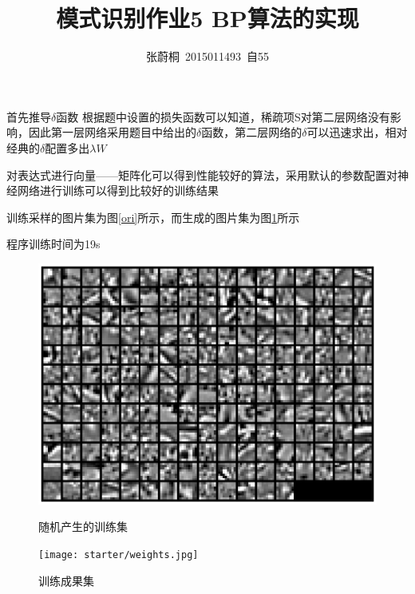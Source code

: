 \documentclass[UTF8,a4paper]{ctexart}
\title{模式识别作业5 BP算法的实现}
\author{张蔚桐\ 2015011493\ 自55}
\begin{document}
\maketitle
首先推导$\delta$函数
根据题中设置的损失函数可以知道，稀疏项S对第二层网络没有影响，因此第一层网络采用题目中给出的$\delta$函数，第二层网络的$\delta$可以迅速求出，相对经典的$\delta$配置多出$\lambda W$

对表达式进行向量——矩阵化可以得到性能较好的算法，采用默认的参数配置对神经网络进行训练可以得到比较好的训练结果

训练采样的图片集为图\ref{ori}所示，而生成的图片集为图\ref{out}所示

程序训练时间为19s
\begin{figure}
\centering
\includegraphics[width=\textwidth]{starter/ori.eps}
\caption{随机产生的训练集}
\label{ori}
\texttt{[image: starter/weights.jpg]}
\caption{训练成果集}
\label{out}
\end{figure}
\end{document}
